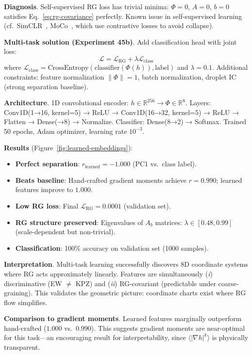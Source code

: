 \documentclass[aps,pre,reprint,amsmath,amssymb,superscriptaddress]{revtex4-2}
\newcommand{\bbR}{\mathbb{R}}
\begin{document}
\textbf{Diagnosis}. Self-supervised RG loss has trivial minima: $\Phi = 0$, $A = 0$, $b = 0$ satisfies Eq.~\eqref{eq:rg-covariance} perfectly. Known issue in self-supervised learning (cf.~SimCLR~\cite{Chen2020}, MoCo~\cite{He2020}, which use contrastive losses to avoid collapse).

\textbf{Multi-task solution (Experiment 45b)}. Add classification head with joint loss:
\begin{equation}
\mathcal{L} = \mathcal{L}_{\text{RG}} + \lambda \mathcal{L}_{\text{class}}
\end{equation}
where $\mathcal{L}_{\text{class}} = \text{CrossEntropy}(\text{classifier}(\Phi(h)), \text{label})$ and $\lambda = 0.1$. Additional constraints: feature normalization $\|\Phi\| = 1$, batch normalization, droplet IC (strong separation baseline).

\textbf{Architecture}. 1D convolutional encoder: $h \in \bbR^{256} \to \Phi \in \bbR^8$. Layers: Conv1D(1→16, kernel=5) → ReLU → Conv1D(16→32, kernel=5) → ReLU → Flatten → Dense(→8) → Normalize. Classifier: Dense(8→2) → Softmax. Trained 50 epochs, Adam optimizer, learning rate $10^{-3}$.

\textbf{Results} (Figure~\ref{fig:learned-embeddings}):

\begin{itemize}
\item \textbf{Perfect separation}: $r_{\text{learned}} = -1.000$ (PC1 vs.~class label).
\item \textbf{Beats baseline}: Hand-crafted gradient moments achieve $r = 0.990$; learned features improve to $1.000$.
\item \textbf{Low RG loss}: Final $\mathcal{L}_{\text{RG}} = 0.0001$ (validation set).
\item \textbf{RG structure preserved}: Eigenvalues of $A_b$ matrices: $\lambda \in [0.48, 0.99]$ (scale-dependent but non-trivial).
\item \textbf{Classification}: 100\% accuracy on validation set (1000 samples).
\end{itemize}

\textbf{Interpretation}. Multi-task learning successfully discovers 8D coordinate systems where RG acts approximately linearly. Features are simultaneously (\textit{i}) discriminative (EW $\neq$ KPZ) and (\textit{ii}) RG-covariant (predictable under coarse-graining). This validates the geometric picture: coordinate charts exist where RG flow simplifies.

\textbf{Comparison to gradient moments}. Learned features marginally outperform hand-crafted ($1.000$ vs.~$0.990$). This suggests gradient moments are near-optimal for this task---an encouraging result for interpretability, since $\langle |\nabla h|^k \rangle$ is physically transparent.
\end{document}
